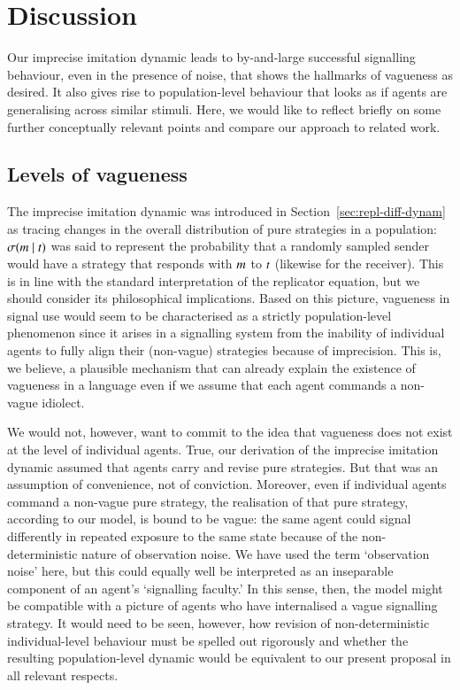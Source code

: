 \documentclass[11pt,english]{article}
\numberwithin{equation}{section}
\begin{document}

\section{Discussion}
\label{sec:discussion}

Our imprecise imitation dynamic leads to by-and-large successful signalling behaviour, even in
the presence of noise, that shows the hallmarks of vagueness as desired. It also gives rise to
population-level behaviour that looks as if agents are generalising across similar
stimuli. Here, we would like to reflect briefly on some further conceptually relevant points
and compare our approach to related work.

\subsection{Levels of vagueness}
The imprecise imitation dynamic was introduced in Section~\ref{sec:repl-diff-dynam} as tracing
changes in the overall distribution of pure strategies in a population:
$\sigma(m \mid t)$ was said to represent the probability that a randomly sampled
sender would have a strategy that responds with $m$ to $t$ (likewise for the
receiver). This is in line with the standard interpretation of the replicator equation, but we
should consider its philosophical implications. Based on this picture, vagueness in signal use
would seem to be characterised as a strictly population-level phenomenon since it arises in a
signalling system from the inability of individual agents to fully align their (non-vague)
strategies because of imprecision. This is, we believe, a plausible mechanism that can already
explain the existence of vagueness in a language even if we assume that each agent commands a
non-vague idiolect.

We would not, however, want to commit to the idea that vagueness does not exist at the level of
individual agents. True, our derivation of the imprecise imitation dynamic assumed that agents
carry and revise pure strategies. But that was an assumption of convenience, not of
conviction. Moreover, even if individual agents command a non-vague pure strategy, the
realisation of that pure strategy, according to our model, is bound to be vague: the same
agent could signal differently in repeated exposure to the same state because of the non-deterministic nature of observation noise. We have used the term
`observation noise' here, but this could equally well be interpreted as an
inseparable component of an agent's `signalling faculty.' In this sense, then, the model might
be compatible with a picture of agents who have internalised a vague signalling
strategy. It would need to be seen, however, how revision of non-deterministic individual-level
behaviour must be spelled out rigorously and whether the resulting population-level dynamic
would be equivalent to our present proposal in all relevant respects.
\end{document}
